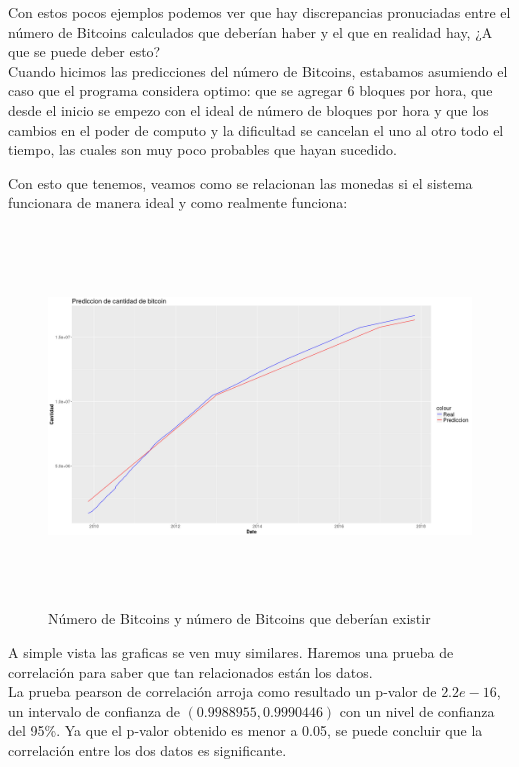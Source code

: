 \documentclass[12pt,letterpaper]{article}
\begin{document}
    Con estos pocos ejemplos podemos ver que hay discrepancias pronuciadas entre el n\'umero de Bitcoins calculados que deber\'ian haber y el que en realidad hay, ¿A que se puede deber esto?
    \\
    Cuando hicimos las predicciones del n\'umero de Bitcoins, estabamos asumiendo el caso que el programa considera optimo: que se agregar 6 bloques por hora, que desde el inicio se empezo con el ideal de n\'umero de bloques por hora y que los cambios en el poder de computo y la dificultad se cancelan el uno al otro todo el tiempo, las cuales son muy poco probables que hayan sucedido.

    Con esto que tenemos, veamos como se relacionan las monedas si el sistema funcionara de manera ideal y como realmente funciona:

    \begin{figure}
        \centering

        \includegraphics[width = 18cm, height = 10cm]{btc/prediccionBTC}

        \caption{N\'umero de Bitcoins y n\'umero de Bitcoins que deber\'ian existir}
    \end{figure}

    A simple vista las graficas se ven muy similares. Haremos una prueba de correlaci\'on para saber que tan relacionados est\'an los datos.
    \\
    La prueba pearson de correlaci\'on arroja como resultado un p-valor de $2.2e-16$, un intervalo de confianza de $(0.9988955, 0.9990446)$ con un nivel de confianza del 95\%. Ya que el p-valor obtenido es menor a 0.05, se puede concluir que la correlaci\'on entre los dos datos es significante.
    \\
\end{document}
